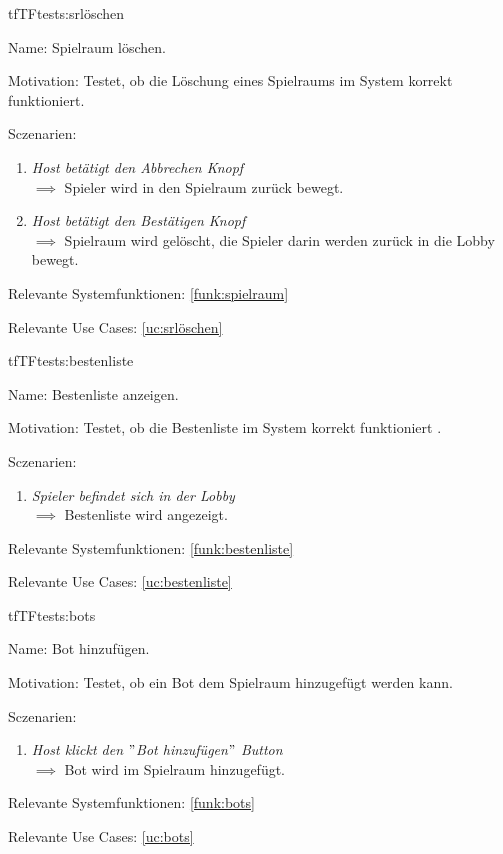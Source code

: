 \begin{description}[leftmargin=5em, style=sameline]
\begin{lhp}{tf}{TF}{tests:srlöschen}
	\item [Name:] Spielraum löschen.
	\item [Motivation:] Testet, ob die Löschung eines Spielraums im System korrekt funktioniert.
	\item [Sczenarien:] \hfill
		\begin{enumerate}
			\item \textit{Host betätigt den Abbrechen Knopf} \\ $\implies$ Spieler wird in den Spielraum zurück bewegt.
			\item \textit{Host betätigt den Bestätigen Knopf} \\ $\implies$ Spielraum wird gelöscht, die Spieler darin werden zurück in die Lobby bewegt.
		\end{enumerate}
    \item [Relevante Systemfunktionen:] \ref{funk:spielraum}
	\item [Relevante Use Cases:] \ref{uc:srlöschen}
\end{lhp}



\begin{lhp}{tf}{TF}{tests:bestenliste}
	\item [Name:] Bestenliste anzeigen.
	\item [Motivation:] Testet, ob die Bestenliste im System korrekt funktioniert .
	\item [Sczenarien:] \hfill
		\begin{enumerate}
			\item \textit{Spieler befindet sich in der Lobby} \\ $\implies$ Bestenliste wird angezeigt.
		\end{enumerate}
	\item [Relevante Systemfunktionen:] \ref{funk:bestenliste}
	\item [Relevante Use Cases:] \ref{uc:bestenliste}
\end{lhp}

\begin{lhp}{tf}{TF}{tests:bots}
	\item [Name:] Bot hinzufügen.
	\item [Motivation:] Testet, ob ein Bot dem Spielraum hinzugefügt werden kann.
	\item [Sczenarien:] \hfill
		\begin{enumerate}
			\item \textit{Host klickt den $"$Bot hinzufügen$"$ Button} \\ $\implies$ Bot wird im Spielraum hinzugefügt.
		\end{enumerate}
	\item [Relevante Systemfunktionen:] \ref{funk:bots}
	\item [Relevante Use Cases:] \ref{uc:bots}
\end{lhp}


\end{description}
